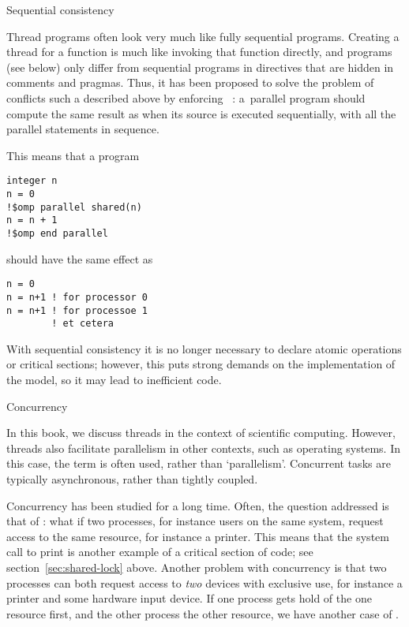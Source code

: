 
 {Sequential consistency}
\label{sec:seq-consist}

Thread programs often look very much like fully sequential
programs. Creating a thread for a function is much like invoking that
function directly, and  programs (see below) only
differ from sequential programs in directives that are hidden in
comments and pragmas. Thus, it has been proposed to solve the problem
of conflicts such a described above by enforcing ~\cite{Lamport:sequential}: a~parallel program should
compute the same result as when its source is executed sequentially,
with all the parallel statements in sequence.

This means that a program
\begin{verbatim}
integer n
n = 0
!$omp parallel shared(n)
n = n + 1
!$omp end parallel
\end{verbatim}
should have the same effect as
\begin{verbatim}
n = 0
n = n+1 ! for processor 0
n = n+1 ! for processoe 1
        ! et cetera
\end{verbatim}
With sequential consistency it is no longer necessary to declare
atomic operations or critical sections; however, this puts strong
demands on the implementation of the model, so it may lead to
inefficient code.

 {Concurrency}

In this book, we discuss threads in the context of scientific
computing. However, threads also facilitate parallelism in other contexts,
such as operating systems. In this case, the term
 is often used, rather than `parallelism'.
Concurrent tasks are typically asynchronous, rather than tightly coupled.

Concurrency has been studied for a long time. Often, the question
addressed is that of : what if two
processes, for instance users on the same system, request access to
the same resource, for instance a printer. This means that the system
call to print is another example of a critical section of code; see
section~\ref{sec:shared-lock} above. Another problem with concurrency
is that two processes can both request access to \emph{two} devices
with exclusive use, for instance a printer and some hardware input
device. If one process gets hold of the one resource first, and the
other process the other resource, we have another case of
.


